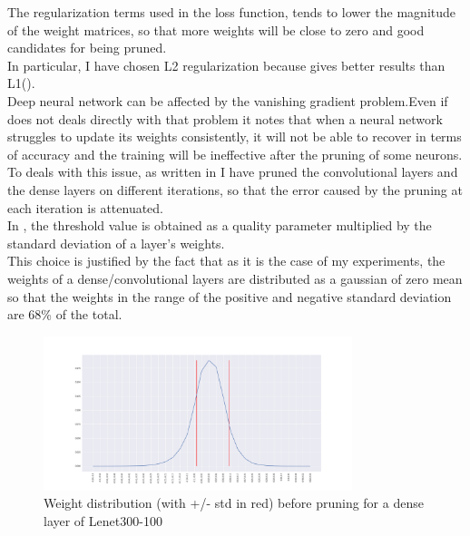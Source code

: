 \documentclass[journal]{vgtc}                %
\begin{document}
The regularization terms used in the loss function, tends to lower the magnitude of the weight matrices, so that more weights will be close to zero and good candidates for being pruned.\\In particular, I have chosen L2 regularization because gives better results than L1(\cite{p1}).\\Deep neural network can be affected by the vanishing gradient problem.Even if \cite{p1} does not deals directly with that problem it notes that when a neural network struggles to update its weights consistently, it will not be able to recover in terms of accuracy and the training will be ineffective after the pruning of some neurons. \\To deals with this issue, as written in  \cite{p1} I have pruned the convolutional layers and the dense layers on different iterations, so that the error caused by the pruning at each iteration is attenuated.\\In \cite{p1}, the threshold value is obtained as a quality parameter multiplied by the standard deviation of a layer's weights.\\This choice is justified by the fact that as it is the case of my experiments, the weights of a dense/convolutional layers are distributed as a gaussian of zero mean so that the weights in the range of the positive and negative standard deviation are 68\% of the total.
\begin{figure}[H]
	\includegraphics[width=90mm,scale=0.7]{weigth-dis}
	\caption{Weight distribution  (with +/- std in red) before pruning for a dense layer of Lenet300-100 }
\end{figure}
\end{document}
